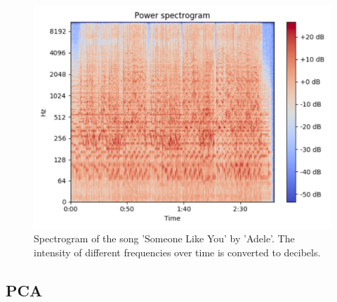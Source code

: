 \begin{figure}[h]
    \centering
	\includegraphics[width=140mm]{./img/ilustrative_spectrogram.png}
	\caption{Spectrogram of the song 'Someone Like You' by 'Adele'. The intensity of different frequencies over time is converted to decibels.}
	\label{fig:ilustrative_specrogram}
\end{figure}

\subsection{PCA}

